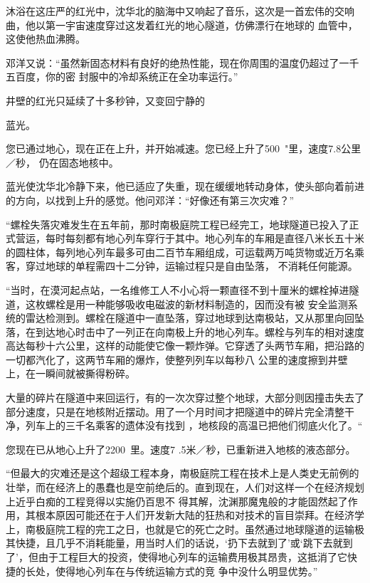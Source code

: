 \documentclass{article}
\begin{document}
沐浴在这庄严的红光中，沈华北的脑海中又响起了音乐，这次是一首宏伟的交响曲，他以第一宇宙速度穿过这发着红光的地心隧道，仿佛漂行在地球的
血管中，这使他热血沸腾。 

邓洋又说：“虽然新固态材料有良好的绝热性能，现在你周围的温度仍超过了一千五百度，你的密
封服中的冷却系统正在全功率运行。” 

井壁的红光只延续了十多秒钟，又变回宁静的
\newpage

蓝光。 

您已通过地心，现在正在上升，并开始减速。您已经上升了500~"里，速度7.8公里／秒，
仍在固态地核中。 

蓝光使沈华北冷静下来，他已适应了失重，现在缓缓地转动身体，使头部向着前进的方向，以找到上升的感觉。他问邓洋：“好像还有第三次灾难？”

“螺栓失落灾难发生在五年前，那时南极庭院工程已经完工，地球隧道已投入了正式营运，每时每刻都有地心列车穿行于其中。地心列车的车厢是直径八米长五十米的圆柱体，每列地心列车最多可由二百节车厢组成，可运载两万吨货物或近万名乘客，穿过地球的单程需四十二分钟，运输过程只是自由坠落，
不消耗任何能源。 

“当时，在漠河起点站，一名维修工人不小心将一颗直径不到十厘米的螺栓掉进隧道，这枚螺栓是用一种能够吸收电磁波的新材料制造的，因而没有被
\newpage
安全监测系统的雷达检测到。螺栓在隧道中一直坠落，穿过地球到达南极站，又从那里向回坠落，在到达地心时击中了一列正在向南极上升的地心列车。螺栓与列车的相对速度高达每秒十六公里，这样的动能使它像一颗炸弹。它穿透了头两节车厢，把沿路的一切都汽化了，这两节车厢的爆炸，使整列列车以每秒八
公里的速度擦到井壁上，在一瞬间就被撕得粉碎。 

大量的碎片在隧道中来回运行，有的一次次穿过整个地球，大部分则因撞击失去了部分速度，只是在地核附近摆动。用了一个月时间才把隧道中的碎片完全清整干净，列车上的三千名乘客的遗体没有找到
，地核段的高温已把他们彻底火化了。“ 

您现在已从地心上升了2200~里。速度7
.5米／秒，已重新进入地核的液态部分。 

“但最大的灾难还是这个超级工程本身，南极庭院工程在技术上是人类史无前例的壮举，而在经济上的愚蠢也是空前绝后的。直到现在，人们对这样一个在经济规划上近乎白痴的工程竞得以实施仍百思不
\newpage
得其解，沈渊那魔鬼般的才能固然起了作用，其根本原因可能还在于人们开发新大陆的狂热和对技术的盲目崇拜。在经济学上，南极庭院工程的完工之日，也就是它的死亡之时。虽然通过地球隧道的运输极其快捷，且几乎不消耗能量，用当时人们的话说，‘扔下去就到了’或‘跳下去就到了’，但由于工程巨大的投资，使得地心列车的运输费用极其昂贵，这抵消了它快捷的长处，使得地心列车在与传统运输方式的竞
争中没什么明显优势。” 
\end{document}
